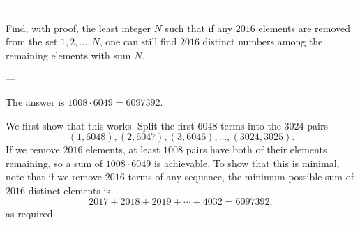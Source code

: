 
---

Find, with proof, the least integer $N$ such that if any $2016$ elements are removed from the set $1,2,\ldots,N$, one can still find $2016$ distinct numbers among the remaining elements with sum $N$.

---

The answer is $1008\cdot 6049=6097392$.

We first show that this works. Split the first $6048$ terms into the $3024$ pairs \[(1,6048),(2,6047),(3,6046),\ldots,(3024,3025).\]
If we remove $2016$ elements, at least $1008$ pairs have both of their elements remaining, so a sum of $1008\cdot 6049$ is achievable. To show that this is minimal, note that if we remove $2016$ terms of any sequence, the minimum possible sum of $2016$ distinct elements is \[2017+2018+2019+\cdots+4032=6097392,\]
as required.
